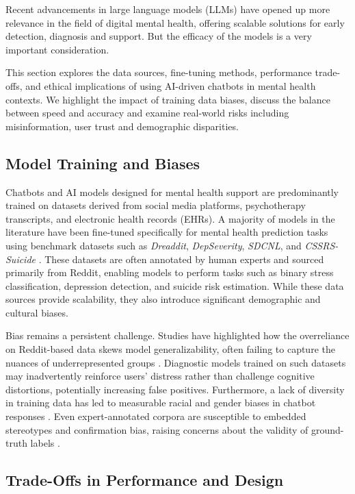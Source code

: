 Recent advancements in large language models (LLMs) have opened up more relevance in the field of digital mental health, offering scalable solutions for early detection, diagnosis and support. 
But the efficacy of the models is a very important consideration. 
 
This section explores the data sources, fine-tuning methods, performance trade-offs, and ethical implications of using AI-driven chatbots in mental health contexts. We highlight the impact of training data biases, discuss the balance between speed and accuracy and examine real-world risks including misinformation, user trust and demographic disparities.

\subsection{Model Training and Biases}

Chatbots and AI models designed for mental health support are predominantly trained on datasets derived from social media platforms, psychotherapy transcripts, and electronic health records (EHRs). A majority of models in the literature have been fine-tuned specifically for mental health prediction tasks using benchmark datasets such as \textit{Dreaddit}, \textit{DepSeverity}, \textit{SDCNL}, and \textit{CSSRS-Suicide} \cite{arriba2024}. These datasets are often annotated by human experts and sourced primarily from Reddit, enabling models to perform tasks such as binary stress classification, depression detection, and suicide risk estimation. While these data sources provide scalability, they also introduce significant demographic and cultural biases.

Bias remains a persistent challenge. Studies have highlighted how the overreliance on Reddit-based data skews model generalizability, often failing to capture the nuances of underrepresented groups \cite{li2023, gbollie2023}. Diagnostic models trained on such datasets may inadvertently reinforce users’ distress rather than challenge cognitive distortions, potentially increasing false positives. Furthermore, a lack of diversity in training data has led to measurable racial and gender biases in chatbot responses \cite{arriba2024}. Even expert-annotated corpora are susceptible to embedded stereotypes and confirmation bias, raising concerns about the validity of ground-truth labels \cite{greco2023}.

\subsection{Trade-Offs in Performance and Design}

